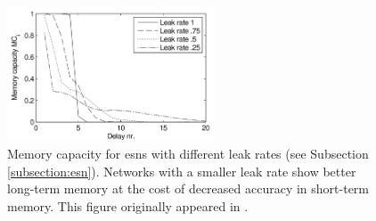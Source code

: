 \begin{figure}[]
	\centering
    \includegraphics[width=0.55\textwidth]{img/leak_rate_verstraeten.png}
	
	\caption[Memory capacity for \acrshort{esn}s with different leak rates (from \citet{verstraeten_towards_2009}).]{
    		Memory capacity for \acrshort{esn}s with different leak rates (see Subsection \ref{subsection:esn}). Networks with a smaller leak rate show better long-term memory at the cost of decreased accuracy in short-term memory. This figure originally appeared in \citet{verstraeten_towards_2009}.
        }
	\label{fig:leak_rate_verstraeten}
\end{figure}


